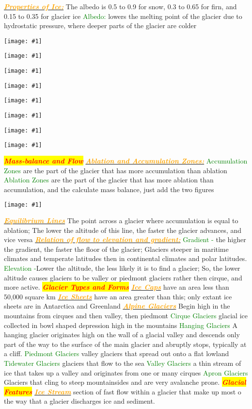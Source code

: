 \documentclass{article}
\newcommand{\red}[1]{\textcolor{red}{#1}}
\newcommand{\green}[1]{\textcolor{green}{#1}}
\newcommand{\orange}[1]{\textcolor{orange}{#1}}
\newcommand{\mysection}[1]{\colorbox{yellow}{\textbf{\textit{\red{#1}}}}}
\newcommand{\mysub}[1]{\underline{\textbf{{\textit{\orange{#1}}}}}}
\newcommand{\mysubsub}[1]{{{\green{#1}}}}
\newcommand{\fig}[1]{
	\texttt{[image: \#1]}
}
\begin{document}
\begin{multicols*}{4}
		\mysub{Properties of Ice:} The albedo is 0.5 to 0.9 for snow, 0.3 to 0.65 for firn, and 0.15 to 0.35 for glacier ice
		\mysubsub{Albedo:} lowers the melting point of the glacier due to hydrostatic pressure, where deeper parts of the glacier are colder
	    \fig{landforms}
        \fig{mtnglacier}
        \fig{moraines}
        \fig{Glacier_Types}
        \fig{hydrology}
        \fig{laurentideicesheet}
        \fig{larsencollapses}
        \fig{glacierflow2}
		\mysection{Mass-balance and Flow}
		\mysub{Ablation and Accumulation Zones:}
		\mysubsub{Accumulation Zones} are the part of the glacier that has more accumulation than ablation
		\mysubsub{Ablation Zones} are the part of the glacier that has more ablation than accumulation, and the calculate mass balance, just add the two figures
		\fig{AblationAccumulationZones}
		\mysub{Equilibrium Lines} The point across a glacier where accumulation is equal to ablation; The lower the altitude of this line, the faster the glacier advances, and vice versa
		\mysub{Relation of flow to elevation and gradient:}
		\mysubsub{Gradient -} the higher the gradient, the faster the floor of the glacier; Glaciers steeper in maritime climates and temperate latitudes then in continental climates and polar latitudes.
		\mysubsub{Elevation -}Lower the altitude, the less likely it is to find a glacier; So, the lower altitude causes glaciers to be valley or piedmont glaciers rather then cirque, and more active.
		\mysection{Glacier Types and Forms}
		\mysub{Ice Caps} have an area less than 50,000 square km
		\mysub{Ice Sheets} have an area greater than this; only extant ice sheets are in Antarctica and Greenland
		\mysub{Alpine Glaciers} Begin high in the mountains from cirques and then valley, then piedmont
		\mysubsub{Cirque Glaciers} glacial ice collected in bowl shaped depression high in the mountains 
		\mysubsub{Hanging Glaciers}  A hanging glacier originates high on the wall of a glacial valley and descends only part of the way to the surface of the main glacier and abruptly stops, typically at a cliff.
		\mysubsub{Piedmont Glaciers} valley glaciers that spread out onto a flat lowland
		\mysubsub{Tidewater Glaciers} glaciers that flow to the sea
		\mysubsub{Valley Glaciers} a thin stream of ice that takes up a valley and originates from one or many cirques
		\mysubsub{Apron Glaciers} Glaciers that cling to steep mountainsides and are very avalanche prone.
	    \mysection{Glacial Features}  
	    \mysub{Ice Stream} section of fast flow within a glacier that make up most o the way that a glacier discharges ice and sediment.

\end{multicols*}
\end{document}
